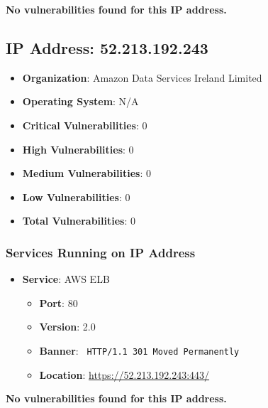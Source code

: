 \documentclass{article}
\begin{document}
\textbf{No vulnerabilities found for this IP address.}




\clearpage



\subsection*{IP Address: 52.213.192.243}

\begin{itemize}
    \item \textbf{Organization}: Amazon Data Services Ireland Limited
    \item \textbf{Operating System}:  N/A 
    \item \textbf{Critical Vulnerabilities}: 0
    \item \textbf{High Vulnerabilities}: 0
    \item \textbf{Medium Vulnerabilities}: 0
    \item \textbf{Low Vulnerabilities}: 0
    \item \textbf{Total Vulnerabilities}: 0
\end{itemize}

\subsubsection*{Services Running on IP Address}

\begin{itemize}
    
        \item \textbf{Service}: AWS ELB
        \begin{itemize}
            \item \textbf{Port}: 80
            \item \textbf{Version}:  2.0 
            \item \textbf{Banner}: \texttt{
                HTTP/1.1 301 Moved Permanently
            }
            \item \textbf{Location}: \href{ https://52.213.192.243:443/ }{ https://52.213.192.243:443/ }
        \end{itemize}
    
\end{itemize}


\textbf{No vulnerabilities found for this IP address.}




\clearpage
\end{document}
